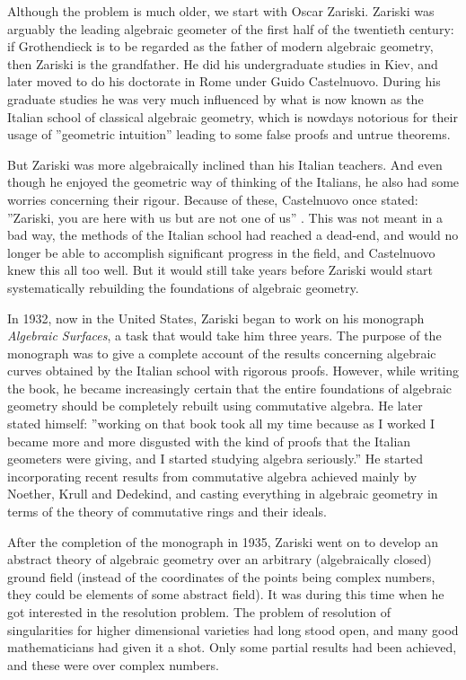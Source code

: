 \documentclass[12pt,a4paper,leqno]{article}
\theoremstyle{plain}
\theoremstyle{definition}
\theoremstyle{remark}
\begin{document}
Although the problem is much older, we start with Oscar Zariski. Zariski was arguably the leading algebraic geometer of the first half of the twentieth century: if Grothendieck is to be regarded as the father of modern algebraic geometry, then Zariski is the grandfather. He did his undergraduate studies in Kiev, and later moved to do his doctorate in Rome under Guido Castelnuovo. During his graduate studies he was very much influenced by what is now known as the Italian school of classical algebraic geometry, which is nowdays notorious for their usage of ''geometric intuition'' leading to some false proofs and untrue theorems.

But Zariski was more algebraically inclined than his Italian teachers. And even though he enjoyed the geometric way of thinking of the Italians, he also had some worries concerning their rigour. Because of these, Castelnuovo once stated: ''Zariski, you are here with us but are not one of us'' \cite{Par}. This was not meant in a bad way, the methods of the Italian school had reached a dead-end, and would no longer be able to accomplish significant progress in the field, and Castelnuovo knew this all too well. But it would still take years before Zariski would start systematically rebuilding the foundations of algebraic geometry.

In 1932, now in the United States, Zariski began to work on his monograph \emph{Algebraic Surfaces}, a task that would take him three years. The purpose of the monograph was to give a complete account of the results concerning algebraic curves obtained by the Italian school with rigorous proofs. However, while writing the book, he became increasingly certain that the entire foundations of algebraic geometry should be completely rebuilt using commutative algebra. He later stated himself: ''working on that book took all my time because as I worked I became more and more disgusted with the kind of proofs that the Italian geometers were giving, and I started studying algebra seriously.'' \cite{Par} He started incorporating recent results from commutative algebra achieved mainly by Noether, Krull and Dedekind, and casting everything in algebraic geometry in terms of the theory of commutative rings and their ideals. 

After the completion of the monograph in 1935, Zariski went on to develop an abstract theory of algebraic geometry over an arbitrary (algebraically closed) ground field (instead of the coordinates of the points being complex numbers, they could be elements of some abstract field). It was during this time when he got interested in the resolution problem. The problem of resolution of singularities for higher dimensional varieties had long stood open, and many good mathematicians had given it a shot. Only some partial results had been achieved, and these were over complex numbers.
\end{document}
